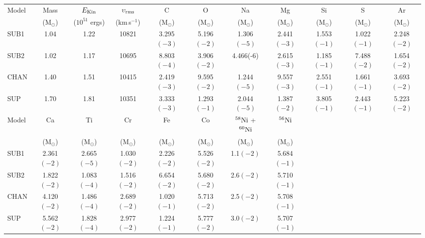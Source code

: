 \documentclass[useAMS,usenatbib,useasmath]{mnras}
\newcommand{\Msun}{\hbox{M$_\odot$}}
\newcommand{\kms}{\hbox{km$\,$s$^{-1}$}}
\newcommand{\elem}[2][default]{$^{#1}{\rm #2}$}
\begin{document}
\begin{table*}
\begin{minipage}[t]{\linewidth}
\centering
 \begin{tabular}{| l | c | c | c | c | c | c | c | c | c | c |} 
 \hline
 Model & Mass & $E_{\rm Kin}$ & $\upsilon_{\rm rms}$ & C & O & Na & Mg & Si & S & Ar \\  [0.5ex]
  & (\Msun) & ($10^{51}$ ergs) & (\kms) & (\Msun) & (\Msun) & (\Msun) & (\Msun) & (\Msun) & (\Msun) & (\Msun) \\[0.5ex] 
 \hline\hline
 SUB1 & 1.04 & 1.22 & 10821 & 3.295$(-3)$ & 5.196$(-2)$ & 1.306$(-5)$ & 2.441$(-3)$ & 1.553$(-1)$ & 1.022$(-1)$ & 2.248$(-2)$ \\
 SUB2 & 1.02 & 1.17 & 10695 & 8.803$(-4)$ & 3.906$(-2)$ & 4.466(-6) & 2.615$(-3)$ & 1.185$(-1)$ & 7.488$(-2)$ & 1.654$(-2)$ \\ 
 CHAN & 1.40 & 1.51 & 10415 & 2.419$(-3)$ & 9.595$(-2)$ & 1.244$(-5)$ & 9.557$(-3)$ & 2.551$(-1)$ & 1.661$(-1)$ & 3.693$(-2)$ \\
 SUP  & 1.70 & 1.81 & 10351 & 3.333$(-3)$ & 1.293$(-1)$ & 2.044$(-5)$ & 1.387$(-2)$ & 3.805$(-1)$ & 2.443$(-1)$ & 5.223$(-2)$ \\
 \hline
 Model & Ca & Ti & Cr & Fe & Co & \elem[58]{Ni} + \elem[60]{Ni} & \elem[56]{Ni}  \\ [0.5ex]
& (\Msun) & (\Msun) & (\Msun) & (\Msun) & (\Msun) & (\Msun) & (\Msun)  \\ [0.5ex] 
 \hline\hline
 SUB1 & 2.361$(-2)$ & 2.665$(-5)$ & 1.030$(-2)$ & 2.226$(-2)$ & 5.526$(-2)$ & 1.1$(-2)$ & 5.684$(-1)$  \\
 SUB2 & 1.822$(-2)$ & 1.083$(-4)$ & 1.516$(-2)$ & 6.654$(-2)$ & 5.680$(-2)$ & 2.6$(-2)$ & 5.710$(-1)$  \\ 
 CHAN & 4.120$(-2)$ & 1.486$(-4)$ & 2.689$(-2)$ & 1.020$(-1)$ & 5.713$(-2)$ & 2.5$(-2)$ & 5.708$(-1)$  \\
 SUP  & 5.562$(-2)$ & 1.828$(-4)$ & 2.977$(-2)$ & 1.224$(-1)$ & 5.777$(-2)$ & 3.0$(-2)$ & 5.707$(-1)$  \\
 \hline
 \end{tabular}
\caption[]{Model summary. Listed are the masses in \Msun, ejecta kinetic energies in $10^{51}$ ergs, and the root mean square of the velocity in \kms. Also listed is model mass information  in \Msun\ at 0.75 days post explosion. The parentheses (\#) correspond to $\times10^{\#}$}
\label{model_info_abund}
\end{minipage}
\end{table*}
\end{document}
